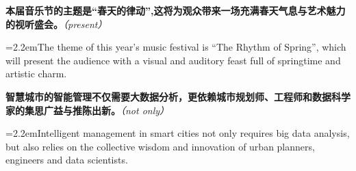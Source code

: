 \documentclass[11pt,a4paper]{article}
\newcommand{\num}[1]{\makebox[1.9em][r]{#1.}\hspace{0.3em}}
\newcommand{\prompt}[1]{\emph{\textcolor{tipblue}{\small（#1）}}}
\begin{document}
\begin{minipage}{\linewidth}

\num{15}\textbf{本届音乐节的主题是“春天的律动”,这将为观众带来一场充满春天气息与艺术魅力的视听盛会。}\prompt{present}

\vspace{0.15em}

\noindent\hangindent=2.2em\hspace{2.2em}The theme of this year’s music festival is “The Rhythm of Spring”, which will present the audience with a visual and auditory feast full of springtime and artistic charm.

\end{minipage}

\begin{minipage}{\linewidth}

\num{16}\textbf{智慧城市的智能管理不仅需要大数据分析，更依赖城市规划师、工程师和数据科学家的集思广益与推陈出新。}\prompt{not only}

\vspace{0.15em}

\noindent\hangindent=2.2em\hspace{2.2em}Intelligent management in smart cities not only requires big data analysis, but also relies on the collective wisdom and innovation of urban planners, engineers and data scientists.

\end{minipage}
\end{document}
